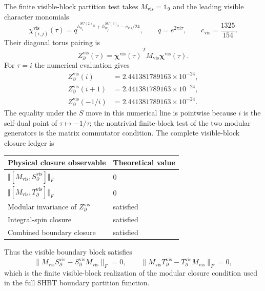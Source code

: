 \documentclass[11pt,letterpaper]{article}
\theoremstyle{plain}
\begin{document}
The finite visible-block partition test takes $M_{\text{vis}}=\mathbb 1_9$ and the
leading visible character monomials
\begin{equation}
\label{eq:section-three-code-character-vector}
 \chi^{\text{vis}}_{(i,j)}(\tau)
 =
 q^{h^{SU(2)_{26}}_{a_i}+h^{SU(3)_8}_{w_j}-c_{\text{vis}}/24},
 \qquad
 q=e^{2\pi i\tau},
 \qquad
 c_{\text{vis}}=\frac{1325}{154}.
\end{equation}
Their diagonal torus pairing is
\begin{equation}
\label{eq:section-three-code-z}
 Z_{\partial}^{\text{vis}}(\tau)
 =
 \overline{\boldsymbol\chi^{\text{vis}}(\tau)}^{\,T}
 M_{\text{vis}}\boldsymbol\chi^{\text{vis}}(\tau).
\end{equation}
For $\tau=i$ the numerical evaluation gives
\begin{align}
\label{eq:section-three-code-z-numerical}
 Z_{\partial}^{\text{vis}}(i)
 &=
 2.441381789163\times10^{-24},\nonumber\\
 Z_{\partial}^{\text{vis}}(i+1)
 &=
 2.441381789163\times10^{-24},\\
 Z_{\partial}^{\text{vis}}(-1/i)
 &=
 2.441381789163\times10^{-24}.
\end{align}
The equality under the $S$ move in this numerical line is pointwise because
$i$ is the self-dual point of $\tau\mapsto-1/\tau$; the nontrivial finite-block
test of the two modular generators is the matrix commutator condition.
The complete visible-block closure ledger is
\begin{center}
\begin{tabular}{@{}ll@{}}
\toprule
Physical closure observable & Theoretical value \\
\midrule
$\Vert[M_{\text{vis}},S_{\partial}^{\text{vis}}]\Vert_F$ & $0$ \\
$\Vert[M_{\text{vis}},T_{\partial}^{\text{vis}}]\Vert_F$ & $0$ \\
Modular invariance of $Z_{\partial}^{\text{vis}}$ & satisfied \\
Integral-spin closure & satisfied \\
Combined boundary closure & satisfied \\
\bottomrule
\end{tabular}
\end{center}
Thus the visible boundary block satisfies
\begin{equation}
\label{eq:section-three-code-commutator-result}
 \|M_{\text{vis}}S_{\partial}^{\text{vis}}
 -S_{\partial}^{\text{vis}}M_{\text{vis}}\|_F=0,
 \qquad
 \|M_{\text{vis}}T_{\partial}^{\text{vis}}
 -T_{\partial}^{\text{vis}}M_{\text{vis}}\|_F=0,
\end{equation}
which is the finite visible-block realization of the modular closure condition
used in the full SHBT boundary partition function.
\end{document}

